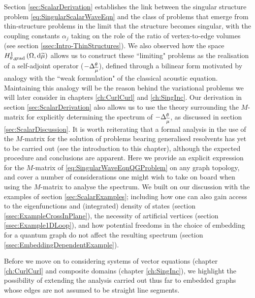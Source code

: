 Section \ref{sec:ScalarDerivation} establishes the link between the singular structure problem \eqref{eq:SingularScalarWaveEqn} and the class of problems that emerge from thin-structure problems in the limit that the structure becomes singular, with the coupling constants $\alpha_j$ taking on the role of the ratio of vertex-to-edge volumes (see section \ref{ssec:Intro-ThinStructures}).
We also observed how the space $H^1_{\theta, \mathrm{grad}}\left( \Omega, \mathrm{d}\widetilde{\mu} \right)$ allows us to construct these ``limiting" problems as the realisation of a self-adjoint operator ($-\Delta_{\widetilde{\mu}}^{\theta}$), defined through a bilinear form motivated by analogy with the ``weak formulation" of the classical acoustic equation.
Maintaining this analogy will be the reason behind the variational problems we will later consider in chapters \ref{ch:CurlCurl} and \ref{ch:SingInc}.
Our derivation in section \ref{sec:ScalarDerivation} also allows us to use the theory surrounding the $M$-matrix for explicitly determining the spectrum of $-\Delta_{\widetilde{\mu}}^{\theta}$, as discussed in section \ref{sec:ScalarDiscussion}.
It is worth reiterating that a formal analysis in the use of the $M$-matrix for the solution of problems bearing generalised resolvents has yet to be carried out (see the introduction to this chapter), although the expected procedure and conclusions are apparent.
Here we provide an explicit expression for the $M$-matrix of \eqref{eq:SingularWaveEqnQGProblem} on any graph topology, and cover a number of considerations one might wish to take on board when using the $M$-matrix to analyse the spectrum.
We built on our discussion with the examples of section \ref{sec:ScalarExamples}; including how one can also gain access to the eigenfunctions and (integrated) density of states (section \ref{ssec:ExampleCrossInPlane}), the necessity of artificial vertices (section \ref{ssec:Example1DLoop}), and how potential freedoms in the choice of embedding for a quantum graph do not affect the resulting spectrum (section \ref{ssec:EmbeddingDependentExample}).

Before we move on to considering systems of vector equations (chapter \ref{ch:CurlCurl} and composite domains (chapter \ref{ch:SingInc}), we highlight the possibility of extending the analysis carried out thus far to embedded graphs whose edges are not assumed to be straight line segments.

